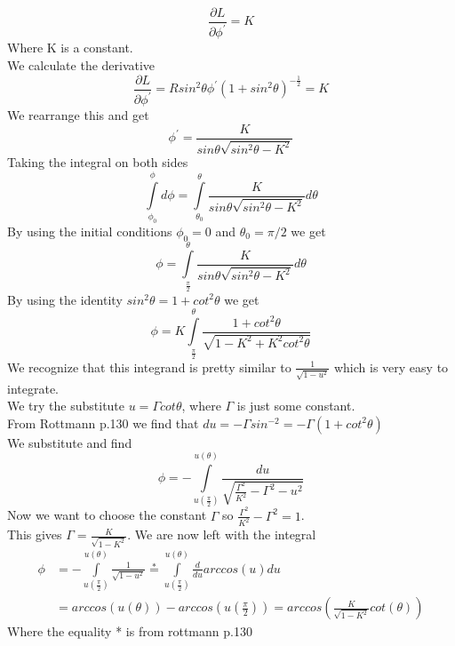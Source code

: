 \documentclass[11pt,a4paper]{report}
\newcommand{\pfrac}[2]{\frac{\partial #1}{\partial #2}}
\newcounter{excount}[chapter]
\newenvironment{exercise}[1][]{\addtocounter{excount}{1} \noindent {\bf Question
    \arabic{excount} \ \ #1}\hspace{2mm}}{\vspace{4mm}}
\begin{document}
\begin{exercise}{\bf Finding the shortest way\\}
\begin{equation}
\pfrac{L}{\phi^{\prime}} = K
\end{equation}
Where K is a constant.\\
We calculate the derivative
\begin{equation}
\pfrac{L}{\phi^{\prime}} = Rsin^2 \theta \phi^{\prime}(1 + sin^2 \theta )^{-\frac{1}{2}} = K
\end{equation}
We rearrange this and get
\begin{equation}
\phi^{\prime} = \frac{K}{sin\theta \sqrt{sin^2 \theta - K^2}}
\end{equation}
Taking the integral on both sides
\begin{equation}
\int\limits_{\phi_0}^{\phi} d\phi = \int\limits_{\theta_0}^{\theta}\frac{K}{sin\theta \sqrt{sin^2 \theta - K^2}} d\theta
\end{equation}
By using the initial conditions $\phi_0 = 0$ and $\theta_0 = \pi /2$ we get
\begin{equation}
\phi = \int\limits_{\frac{\pi}{2}}^{\theta}\frac{K}{sin\theta \sqrt{sin^2 \theta - K^2}} d\theta
\end{equation}
By using the identity $sin^2 \theta = 1 + cot^2 \theta$ we get
\begin{equation}
\phi = K\int\limits_{\frac{\pi}{2}}^{\theta} \frac{1 + cot^2 \theta}{\sqrt{1 - K^2 + K^2 cot^2 \theta}}
\end{equation}
We recognize that this integrand is pretty similar to $\frac{1}{\sqrt{1 - u^2}}$ which is very easy to integrate.\\
We try the substitute $u = \Gamma cot \theta$, where $\Gamma$ is just some constant.\\
From Rottmann p.130 we find that $du = -\Gamma sin^{-2} = -\Gamma (1 + cot^2 \theta)$\\
We substitute and find
\begin{equation}
\phi = -\int\limits_{u(\frac{\pi}{2})}^{u(\theta)}\frac{du}{\sqrt{\frac{\Gamma^2}{K^2} - \Gamma^2 - u^2}}
\end{equation}
Now we want to choose the constant $\Gamma$ so $\frac{\Gamma^2}{K^2} - \Gamma^2 = 1$. \\
This gives $\Gamma = \frac{K}{\sqrt{1 - K^2}}$. We are now left with the integral
\begin{align*}
\phi &= -\int\limits_{u(\frac{\pi}{2})}^{u(\theta)}\frac{1}{\sqrt{1 - u^2}} \stackrel{*}{=}  \int\limits_{u(\frac{\pi}{2})}^{u(\theta)}\frac{d }{du}arccos(u) du \\
&= arccos(u(\theta)) - arccos(u(\frac{\pi}{2})) = arccos(\frac{K}{\sqrt{1 - K^2}} cot(\theta))
\end{align*}
Where the equality * is from rottmann p.130
\end{exercise}
\end{document}
